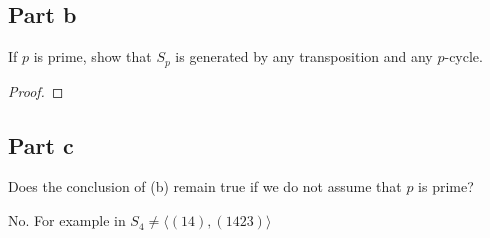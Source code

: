 \subsection{Part b}

\begin{question}
    If $p$ is prime, show that $S_p$ is generated by any transposition and any $p$-cycle.
\end{question}

\begin{answer}
    \begin{proof}
        
    \end{proof}
\end{answer}

\subsection{Part c}

\begin{question}
    Does the conclusion of (b) remain true if we do not assume that $p$ is prime?
\end{question}

\begin{answer}
    No. For example in $S_4 \neq \langle (14),(1423) \rangle$
\end{answer}